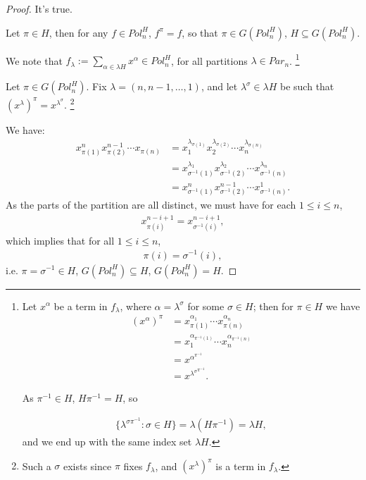 \documentclass[12pt]{extarticle}
\newcommand{\set}[1]{\{#1\}}
\newcommand{\<}{\langle}
\renewcommand{\>}{\rangle}
\theoremstyle{definition}
\begin{document}
\begin{proof}
  It's true.

  Let $\pi \in H$, then for any $f \in Pol_n^H$, $f^{\pi} = f$, so that $\pi \in G(Pol_n^H)$, $H \subseteq G(Pol_n^H)$.

  We note that $f_{\lambda} := \sum\limits_{\alpha \in \lambda H} x^{\alpha} \in Pol_n^H$, for all partitions $\lambda \in Par_n$.
  \footnote{Let $x^\alpha$ be a term in $f_{\lambda}$, where $\alpha = \lambda^{\sigma}$ for some $\sigma \in H$; then for $\pi \in H$ we have
  \begin{align*}
    (x^\alpha)^{\pi}
    &= x_{\pi(1)}^{\alpha_1} \cdots x_{\pi(n)}^{\alpha_n} \\
    &= x_{1}^{\alpha_{\pi^{-1}(1)}} \cdots x_{n}^{\alpha_{\pi^{-1}(n)}} \\
    &= x^{\alpha^{\pi^{-1}}} \\ 
    &= x^{{\lambda^{\sigma}}^{\pi^{-1}}}.
  \end{align*}

  As $\pi^{-1} \in H$, $H\pi^{-1} = H$, so 
  
  \begin{align*}
    \set{\lambda^{\sigma \pi^{-1}}: \sigma \in H} = \lambda(H \pi^{-1}) = \lambda H,
  \end{align*}
  and we end up with the same index set $\lambda H$.

  }

  Let $\pi \in G(Pol_n^H)$. Fix $\lambda = (n, n-1, \dots, 1)$, and let $\lambda^{\sigma} \in \lambda H$ be such that ${(x^{\lambda})}^{\pi} = x^{\lambda^{\sigma}}$. \footnote{Such a $\sigma$ exists since $\pi$ fixes $f_{\lambda}$, and ${(x^\lambda)}^{\pi}$ is a term in $f_{\lambda}$.}
  
  We have:
  \begin{align*}
    x_{\pi(1)}^nx_{\pi(2)}^{n-1} \cdots x_{\pi(n)}
    &= x_1^{\lambda_{\sigma(1)}} x_2^{\lambda_{\sigma(2)}} \cdots x_n^{\lambda_{\sigma(n)}} \\
    &= x_{\sigma^{-1}(1)}^{\lambda_1} x_{\sigma^{-1}(2)}^{\lambda_2} \cdots x_{\sigma^{-1}(n)}^{\lambda_n} \\
    &= x_{\sigma^{-1}(1)}^{n} x_{\sigma^{-1}(2)}^{n-1} \cdots x_{\sigma^{-1}(n)}^{1}.
  \end{align*}
  As the parts of the partition are all distinct, we must have for each $1 \leq i \leq n$,
  \begin{align*}
    x_{\pi(i)}^{n-i+1} = x_{\sigma^{-1}(i)}^{n-i+1},
  \end{align*}
  which implies that for all $1 \leq i \leq n$,
  \begin{align*}
    \pi(i) = \sigma^{-1}(i),
  \end{align*}
  i.e. $\pi = \sigma^{-1} \in H$, $G(Pol_n^H) \subseteq H$, $G(Pol_n^H) = H$.
\end{proof}
\end{document}
